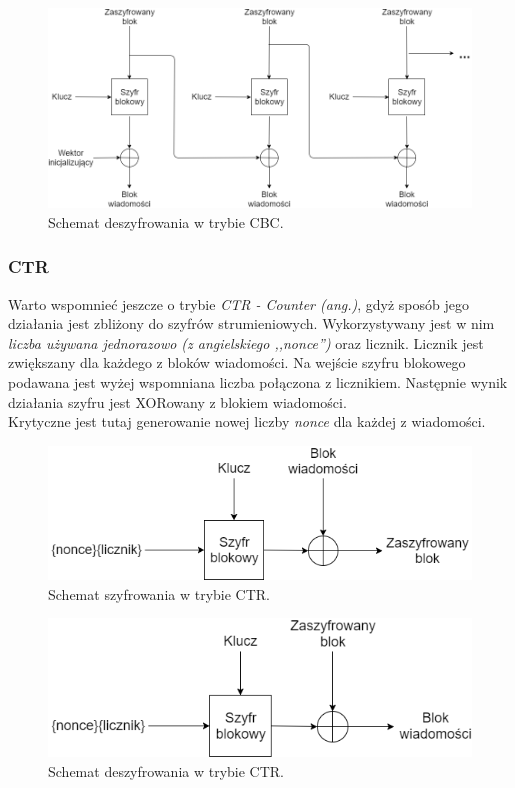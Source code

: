 \begin{figure}
    \centering
	\includegraphics[width=\textwidth]{content/images/cbc-dec-scheme}
    \caption{Schemat deszyfrowania w trybie CBC.}
\end{figure}

\subsubsection{CTR}
Warto wspomnieć jeszcze o trybie \textit{CTR - Counter (ang.)}, gdyż sposób jego działania jest zbliżony 
do szyfrów strumieniowych. Wykorzystywany jest w nim \textit{liczba używana jednorazowo (z angielskiego ,,nonce'')}
oraz licznik. Licznik jest zwiększany dla każdego z bloków wiadomości. 
Na wejście szyfru blokowego podawana jest wyżej wspomniana liczba połączona z licznikiem. Następnie wynik
działania szyfru jest XORowany z blokiem wiadomości. \\
Krytyczne jest tutaj generowanie nowej liczby \textit{nonce} dla każdej z wiadomości. 

\begin{figure}[H]
    \centering
	\includegraphics[width=\textwidth]{content/images/ctr-enc-scheme}
    \caption{Schemat szyfrowania w trybie CTR.}
\end{figure}
\begin{figure}[H]
    \centering
	\includegraphics[width=\textwidth]{content/images/ctr-dec-scheme}
    \caption{Schemat deszyfrowania w trybie CTR.}
\end{figure}

